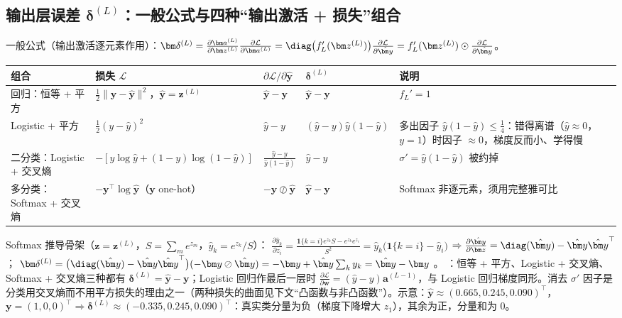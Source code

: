 \subsection{输出层误差 \texorpdfstring{$\bm\delta^{(L)}$}{delta(L)}：一般公式与四种“输出激活 + 损失”组合}
一般公式（输出激活逐元素作用）：$\bm\delta^{(L)}=\frac{\partial\bm a^{(L)}}{\partial\bm z^{(L)}}\frac{\partial\mathcal L}{\partial\bm a^{(L)}}=\diag\big(f_L'(\bm z^{(L)})\big)\frac{\partial\mathcal L}{\partial\hat{\bm y}}=f_L'(\bm z^{(L)})\odot\frac{\partial\mathcal L}{\partial\hat{\bm y}}$。

\noindent\begin{tabularx}{\linewidth}{@{}p{2.9cm}p{3.6cm}p{2.3cm}p{2.5cm}L@{}}
\toprule
组合 & 损失 $\mathcal L$ & $\partial\mathcal L/\partial\hat{\bm y}$ & $\bm\delta^{(L)}$ & 说明 \\
\midrule
回归：恒等 + 平方 & $\frac12\|\bm y-\hat{\bm y}\|^2$，$\hat{\bm y}=\bm z^{(L)}$ & $\hat{\bm y}-\bm y$ & $\hat{\bm y}-\bm y$ & $f_L'=1$ \\
Logistic + 平方 & $\frac12(y-\hat y)^2$ & $\hat y-y$ & $(\hat y-y)\hat y(1-\hat y)$ & 多出因子 $\hat y(1-\hat y)\le\frac14$：错得离谱（$\hat y\approx0$，$y=1$）时因子 $\approx0$，梯度反而小、学得慢 \\
二分类：Logistic + 交叉熵 & $-[y\log\hat y+(1-y)\log(1-\hat y)]$ & $\frac{\hat y-y}{\hat y(1-\hat y)}$ & $\hat y-y$ & $\sigma'=\hat y(1-\hat y)$ 被约掉 \\
多分类：Softmax + 交叉熵 & $-\bm y^\top\log\hat{\bm y}$（$\bm y$ one-hot） & $-\bm y\oslash\hat{\bm y}$ & $\hat{\bm y}-\bm y$ & Softmax 非逐元素，须用完整雅可比 \\
\bottomrule
\end{tabularx}

\noindent Softmax 推导骨架（$\bm z=\bm z^{(L)}$，$S=\sum_me^{z_m}$，$\hat y_k=e^{z_k}/S$）：
$\frac{\partial\hat y_k}{\partial z_i}=\frac{\mathbf 1\{k=i\}e^{z_k}S-e^{z_k}e^{z_i}}{S^2}=\hat y_k\big(\mathbf 1\{k=i\}-\hat y_i\big)$ $\Rightarrow\frac{\partial\hat{\bm y}}{\partial\bm z}=\diag(\hat{\bm y})-\hat{\bm y}\hat{\bm y}^\top$；
$\bm\delta^{(L)}=\big(\diag(\hat{\bm y})-\hat{\bm y}\hat{\bm y}^\top\big)(-\bm y\oslash\hat{\bm y})=-\bm y+\hat{\bm y}\sum_ky_k=\hat{\bm y}-\bm y$ 。
：恒等 + 平方、Logistic + 交叉熵、Softmax + 交叉熵三种都有 $\bm\delta^{(L)}=\hat{\bm y}-\bm y$；Logistic 回归作最后一层时 $\frac{\partial\mathcal L}{\partial\bm w}=(\hat y-y)\bm a^{(L-1)}$，与 Logistic 回归梯度同形。消去 $\sigma'$ 因子是分类用交叉熵而不用平方损失的理由之一（两种损失的曲面见下文“凸函数与非凸函数”）。示意：$\hat{\bm y}\approx(0.665,0.245,0.090)^\top$，$\bm y=(1,0,0)^\top\Rightarrow\bm\delta^{(L)}\approx(-0.335,0.245,0.090)^\top$：真实类分量为负（梯度下降增大 $z_1$），其余为正，分量和为 0。

